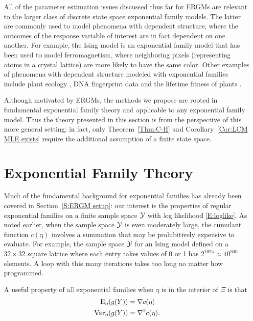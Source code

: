 All of the parameter estimation issues discussed thus far for ERGMs are relevant to 
the larger class of discrete state space exponential family models.
The latter are commonly used to model phenomena with dependent structure, 
where the outcomes of the response variable of interest are in fact dependent on one 
another.  For example, the Ising 
model \citep{Ising,Potts} is an exponential family model that has been used to model 
ferromagnetism, where neighboring 
pixels (representing atoms in a crystal lattice) are more likely to have the same 
color.  
Other examples of phenomena with dependent structure modeled with exponential 
families include
plant ecology \citep{Besag:1974,Besag:1975}, DNA fingerprint data \citep{Geyer:1992}
 and the lifetime fitness of plants \citep
{Shaw:2008}.

Although motivated by ERGMs, the methods we propose are rooted in fundamental
exponential family theory and applicable to any 
exponential family model.  Thus the theory presented in this section is from
the perspective of this more general setting; in fact, only Theorem~\ref{Thm:C-H} and
Corollary~\ref{Cor:LCM MLE exists} require 
the additional assumption of a finite state space.

\section{Exponential Family Theory}
Much of the fundamental background for exponential families has already been
covered in Section~\ref{S:ERGM setup}: our interest is the properties of
 regular exponential
families on a finite sample space ${\mathcal Y}$  with log likelihood \eqref{E:loglike}.
As noted earlier, when the sample space ${\mathcal Y}$ is even moderately large,
the cumulant function $c(\eta)$ involves a summation that may be prohibitively 
expensive to evaluate.  For example, the sample space ${\mathcal Y}$ for an Ising model 
defined on a $32\times 32$ square lattice where each entry takes values of 0 or 1 
has $2^{1024} \approx 10^{300}$ elements.  
A loop with this many iterations takes too long no matter how programmed.

A useful property of all exponential families \cite[p.~27]{TPE2} when 
$\eta$ is in the interior of $\Xi$ is that 
\begin{align*}
	\operatorname{E}_\eta(g(Y)) &= \nabla c(\eta)	\\
	\operatorname{Var}_\eta(g(Y)) &= \nabla^2 c( \eta ).
\end{align*}

